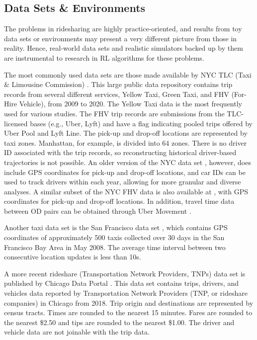\documentclass{article}
\newcommand{\tq}[1]{\textcolor{red}{#1}}
\begin{document}
\subsection{Data Sets \& Environments}\label{sec:data}
The problems in ridesharing are highly practice-oriented, and results from toy data sets or environments may present a very different picture from those in reality. Hence, real-world data sets and realistic simulators backed up by them are instrumental to research in RL algorithms for these problems. 

The most commonly used data sets are those made available by NYC TLC (Taxi \& Limousine Commission) \citep{nycdataset}. This large public data repository contains trip records from several different services, Yellow Taxi, Green Taxi, and FHV (For-Hire Vehicle), from 2009 to 2020. The Yellow Taxi data is the most frequently used for various studies. The FHV trip records are submissions from the TLC-licensed bases (e.g., Uber, Lyft) and have a flag indicating pooled trips offered by Uber Pool and Lyft Line. 
The pick-up and drop-off locations are represented by taxi zones. 
Manhattan, for example, is divided into 64 zones. 
There is no driver ID associated with the trip records, so reconstructing historical driver-based trajectories is not possible. 
An older version of the NYC data set \citep{illinoisdatabankIDB-9610843}, however, does include GPS coordinates for pick-up and drop-off locations, and car IDs can be used to track drivers within each year, allowing for more granular and diverse analyses.
A similar subset of the NYC FHV data is also available at \citep{fivethirtyeight}, with GPS coordinates for pick-up and drop-off locations. In addition, travel time data between OD pairs can be obtained through Uber Movement \citep{ubermovement}. 

Another taxi data set is the San Francisco data set \citep{epfl-mobility-20090224}, which contains GPS coordinates of approximately 500 taxis collected over 30 days in the San Francisco Bay Area in May 2008. The average time interval between two consecutive location updates is less than 10s. 

A more recent rideshare (Transportation Network Providers, TNPs) data set is published by Chicago Data Portal \citep{chicago2018data}. This data set contains trips, drivers, and vehicles data reported by Transportation Network Providers (TNP, or rideshare companies) in Chicago from 2018. Trip origin and destinations are represented by census tracts. Times are rounded to the nearest 15 minutes. Fares are rounded to the nearest \$2.50 and tips are rounded to the nearest \$1.00. The driver and vehicle data are not joinable with the trip data. 
\end{document}

